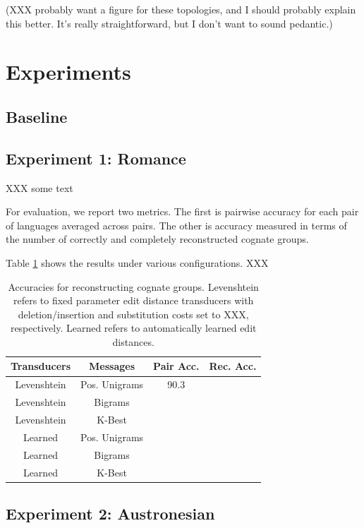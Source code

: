 \documentclass[11pt,a4paper]{article}
\begin{document}
(XXX probably want a figure for these topologies, and I should probably
explain this better. It's really straightforward, but I don't want to sound pedantic.)

\section{Experiments}

\subsection{Baseline}

\subsection{Experiment 1: Romance}

XXX some text


For evaluation, we report two metrics. The first is pairwise accuracy
for each pair of languages averaged across pairs. The other
is accuracy measured in terms of the number of correctly and
completely reconstructed cognate groups. 

Table \ref{tbl:exp1} shows the results under various configurations. XXX

\begin{table}
  \begin{tabular}{|c|c|c|c|}
    Transducers & Messages & Pair Acc. & Rec. Acc.\\
    \hline
    \hline
    Levenshtein&Pos. Unigrams & 90.3 & \\
    Levenshtein&Bigrams & & \\
    Levenshtein&K-Best & & \\
    \hline
    Learned&Pos. Unigrams & & \\
    Learned&Bigrams & & \\
    Learned&K-Best & & \\
  \end{tabular}
  \caption{Accuracies for reconstructing cognate groups. Levenshtein
  refers to fixed parameter edit distance transducers with
  deletion/insertion and substitution costs set to XXX, respectively.
  Learned refers to automatically learned edit distances.}
  \label{tbl:exp1}
\end{table}

\subsection{Experiment 2: Austronesian}
\end{document}

